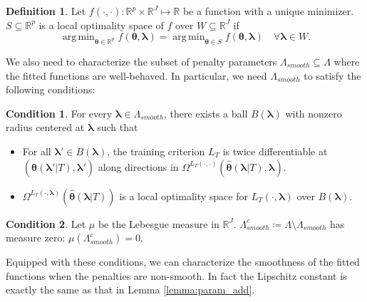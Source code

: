 \documentclass[12pt]{article} %
\theoremstyle{definition}
\newtheorem{definition}{Definition}
\newtheorem{condition}{Condition}
\DeclareMathOperator*{\argmin}{arg\,min}
\begin{document}
\begin{definition}
	Let $f(\cdot, \cdot): \mathbb{R}^p \times \mathbb{R}^J \mapsto \mathbb{R}$ be a function with a unique minimizer.
	$S \subseteq \mathbb{R}^p$ is a local optimality space of $f$ over $W \subseteq \mathbb{R}^J$ if
	\begin{equation}
	\argmin_{\boldsymbol{\theta} \in \mathbb{R}^p} f(\boldsymbol{\theta}, \boldsymbol \lambda) =
	\argmin_{\boldsymbol{\theta} \in S} f(\boldsymbol{\theta}, \boldsymbol \lambda) \quad \forall \boldsymbol \lambda \in W.
	\end{equation}
\end{definition}
We also need to characterize the subset of penalty parameters $\Lambda_{smooth} \subseteq \Lambda$ where the fitted functions are well-behaved.
In particular, we need $\Lambda_{smooth}$ to satisfy the following conditions:
\begin{condition}
	\label{condn:nonsmooth1}
	For every $\boldsymbol{\lambda} \in \Lambda_{smooth}$, there exists a ball $B(\boldsymbol{\lambda})$ with nonzero radius centered at $\boldsymbol{\lambda}$ such that
	\begin{itemize}
		\item For all $\boldsymbol{\lambda}'\in B(\boldsymbol{\lambda})$, the training criterion $L_{T}$ is twice differentiable at $(\hat{\boldsymbol{\theta}}(\boldsymbol{\lambda}'|T), \boldsymbol{\lambda}')$
		along directions in $\Omega^{L_{T}(\cdot,\cdot)}\left(\hat{\boldsymbol{\theta}}(\boldsymbol{\lambda} | T), \boldsymbol{\lambda}\right)$.
		\item $\Omega^{L_T(\cdot, \boldsymbol{\lambda})} \left (\hat{\boldsymbol \theta}\left(\boldsymbol{\lambda}|T \right) \right)$ is a local optimality space for $L_T\left(\cdot,\boldsymbol{\lambda}\right)$ over $B(\boldsymbol{\lambda})$.
	\end{itemize}
\end{condition}
\begin{condition}
	\label{condn:nonsmooth2}
	Let $\mu$ be the Lebesgue measure in $\mathbb{R}^{J}$.
	$\Lambda_{smooth}^c \coloneqq \Lambda \setminus \Lambda_{smooth}$ has measure zero: $\mu(\Lambda_{smooth}^c) = 0$.
\end{condition}

Equipped with these conditions, we can characterize the smoothness of the fitted functions when the penalties are non-smooth. In fact the Lipschitz constant is exactly the same as that in Lemma \ref{lemma:param_add}.
\end{document}

